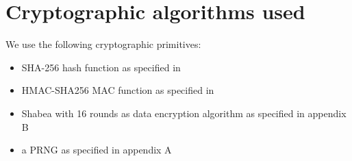 \section{Cryptographic algorithms used}
We use the following cryptographic primitives:
\begin{itemize}
 \item SHA-256 hash function as specified in \cite{FIPS180-2}
 \item HMAC-SHA256 MAC function as specified in \cite{RFC2104}
 \item Shabea with 16 rounds as data encryption algorithm as specified in appendix B
 \item a PRNG as specified in appendix A
\end{itemize}